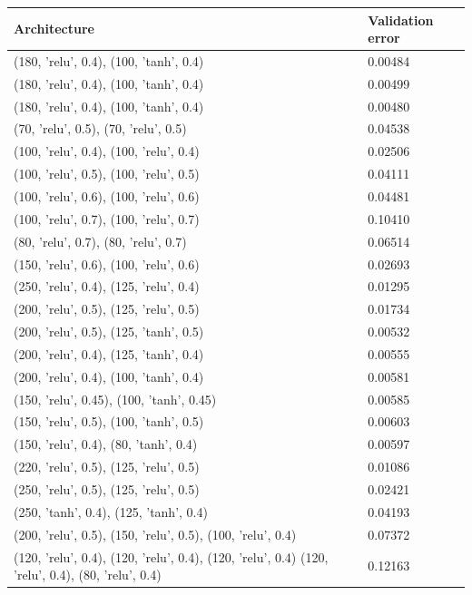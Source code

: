 \begin{table}[h!]
    \centering
    \begin{tabular}{|p{}|p{}|}
        \hline
        Architecture & Validation error \\ \hline
        (180, 'relu', 0.4), (100, 'tanh', 0.4) & 0.00484 \\
        (180, 'relu', 0.4), (100, 'tanh', 0.4) & 0.00499 \\
        (180, 'relu', 0.4), (100, 'tanh', 0.4) & 0.00480 \\
        (70, 'relu', 0.5), (70, 'relu', 0.5) & 0.04538 \\
        (100, 'relu', 0.4), (100, 'relu', 0.4) & 0.02506 \\
        (100, 'relu', 0.5), (100, 'relu', 0.5) & 0.04111 \\
        (100, 'relu', 0.6), (100, 'relu', 0.6) & 0.04481 \\
        (100, 'relu', 0.7), (100, 'relu', 0.7) & 0.10410 \\
        (80, 'relu', 0.7), (80, 'relu', 0.7) & 0.06514 \\
        (150, 'relu', 0.6), (100, 'relu', 0.6) & 0.02693 \\
        (250, 'relu', 0.4), (125, 'relu', 0.4) & 0.01295 \\
        (200, 'relu', 0.5), (125, 'relu', 0.5) & 0.01734 \\
        (200, 'relu', 0.5), (125, 'tanh', 0.5) & 0.00532 \\
        (200, 'relu', 0.4), (125, 'tanh', 0.4) & 0.00555 \\
        (200, 'relu', 0.4), (100, 'tanh', 0.4) & 0.00581 \\
        (150, 'relu', 0.45), (100, 'tanh', 0.45) & 0.00585 \\
        (150, 'relu', 0.5), (100, 'tanh', 0.5) & 0.00603 \\
        (150, 'relu', 0.4), (80, 'tanh', 0.4) & 0.00597 \\
        (220, 'relu', 0.5), (125, 'relu', 0.5) & 0.01086 \\
        (250, 'relu', 0.5), (125, 'relu', 0.5) & 0.02421 \\
        (250, 'tanh', 0.4), (125, 'tanh', 0.4) & 0.04193 \\
        (200, 'relu', 0.5), (150, 'relu', 0.5), (100, 'relu', 0.4) & 0.07372 \\
        (120, 'relu', 0.4), (120, 'relu', 0.4), (120, 'relu', 0.4) (120, 'relu', 0.4), (80, 'relu', 0.4) & 0.12163 \\

\end{tabular}
\end{table}
